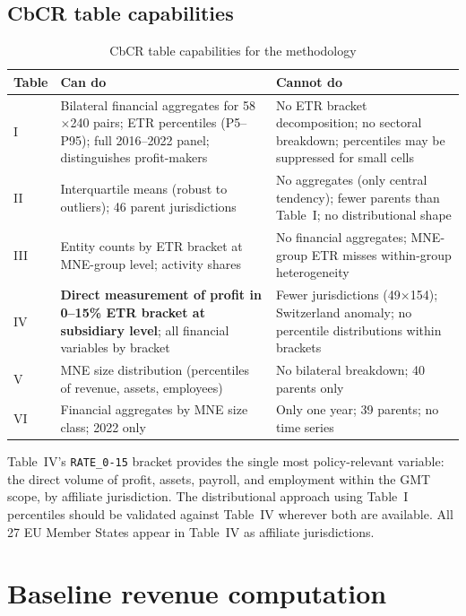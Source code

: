 \documentclass[11pt,a4paper]{article}
\newcommand{\code}[1]{\texttt{#1}}
\begin{document}
\subsection{CbCR table capabilities}\label{sec:table_capabilities}

\begin{table}[H]
\centering
\caption{CbCR table capabilities for the methodology}
\label{tab:capabilities}
\small
\begin{tabular}{@{}lp{5.5cm}p{5.5cm}@{}}
\toprule
Table & Can do & Cannot do \\
\midrule
I & Bilateral financial aggregates for 58$\times$240 pairs; ETR percentiles (P5--P95); full 2016--2022 panel; distinguishes profit-makers & No ETR bracket decomposition; no sectoral breakdown; percentiles may be suppressed for small cells \\
II & Interquartile means (robust to outliers); 46 parent jurisdictions & No aggregates (only central tendency); fewer parents than Table~I; no distributional shape \\
III & Entity counts by ETR bracket at MNE-group level; activity shares & No financial aggregates; MNE-group ETR misses within-group heterogeneity \\
IV & \textbf{Direct measurement of profit in 0--15\% ETR bracket at subsidiary level}; all financial variables by bracket & Fewer jurisdictions (49$\times$154); Switzerland anomaly; no percentile distributions within brackets \\
V & MNE size distribution (percentiles of revenue, assets, employees) & No bilateral breakdown; 40 parents only \\
VI & Financial aggregates by MNE size class; 2022 only & Only one year; 39 parents; no time series \\
\bottomrule
\end{tabular}
\end{table}

Table~IV's \code{RATE\_0-15} bracket provides the single most policy-relevant variable: the direct volume of profit, assets, payroll, and employment within the GMT scope, by affiliate jurisdiction. The distributional approach using Table~I percentiles should be validated against Table~IV wherever both are available. All 27 EU Member States appear in Table~IV as affiliate jurisdictions.

\section{Baseline revenue computation}\label{sec:baseline}
\end{document}
